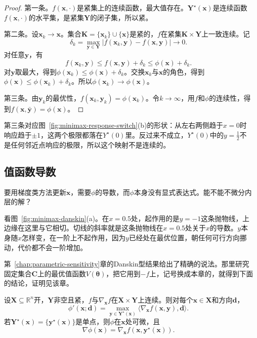 \begin{proof}
第一条。$f(\bm{x},\cdot)$是紧集上的连续函数，最大值存在。$\bm{Y}^\star(\bm{x})$是连续函数$f(\bm{x},\cdot)$的水平集，是紧集$\bm{Y}$的闭子集，所以紧。

第二条。设$\bm{x}_k\to\bm{x}$。集合$\bm{K}=\{\bm{x}_k\}\cup\{\bm{x}\}$是紧的，$f$在紧集$\bm{K}\times\bm{Y}$上一致连续。记
\[
 \delta_k=\max_{\bm{y}\in\bm{Y}}\lvert f(\bm{x}_k,\bm{y})-f(\bm{x},\bm{y})\rvert\to0.
\]
对任意$\bm{y}$，有
\[
 f(\bm{x}_k,\bm{y})\leq f(\bm{x},\bm{y})+\delta_k\leq\phi(\bm{x})+\delta_k.
\]
对$\bm{y}$取最大，得到$\phi(\bm{x}_k)\leq\phi(\bm{x})+\delta_k$。交换$\bm{x}_k$与$\bm{x}$的角色，得到$\phi(\bm{x})\leq\phi(\bm{x}_k)+\delta_k$。所以$\phi(\bm{x}_k)\to\phi(\bm{x})$。

第三条。由$\bm{y}_k$的最优性，$f(\bm{x}_k,\bm{y}_k)=\phi(\bm{x}_k)$。令$k\to\infty$，用$f$和$\phi$的连续性，得到$f(\bm{x},\bar{\bm{y}})=\phi(\bm{x})$。
\end{proof}

第三条对应图~\ref{fig:minimax-response-switch}(b)的形状：从左右两侧趋于$x=0$时响应趋于$\pm1$，这两个极限都落在$Y^\star(0)$里。反过来不成立，$Y^\star(0)$中的$y=\frac12$不是任何邻近点响应的极限，所以这个映射不是连续的。

\subsection{值函数导数}
\label{sec:minimax-danskin}

要用梯度类方法更新$\bm{x}$，需要$\phi$的导数，而$\phi$本身没有显式表达式。能不能不微分内层的解？

看图~\ref{fig:minimax-danskin}(a)。在$x=0.5$处，起作用的是$y=-1$这条抛物线，上边缘在这里与它相切。切线的斜率就是这条抛物线在$x=0.5$处关于$x$的导数。$y$本身随$x$怎样变，在一阶上不起作用，因为$y$已经处在最优位置，朝任何可行方向挪动，代价都不会一阶增加。

第~\ref{chap:parametric-sensitivity}章的Danskin型结果给出了精确的说法。那里研究固定集合$\bm{C}$上的最优值函数$V(\bm{\theta})$，把它用到$-f$上，记号换成本章的，就得到下面的结论，证明见该章。

\begin{theorem}[最坏值函数的方向导数]
\label{thm:minimax-danskin}
设$\bm{X}\subseteq\mathbb{R}^{n}$开，$\bm{Y}$非空且紧，$f$与$\nabla_{\bm{x}}f$在$\bm{X}\times\bm{Y}$上连续。则对每个$\bm{x}\in\bm{X}$和方向$\bm{d}$，
\begin{equation}
 \phi'(\bm{x};\bm{d})=\max_{\bm{y}\in\bm{Y}^\star(\bm{x})}\bigl\langle\nabla_{\bm{x}}f(\bm{x},\bm{y}),\bm{d}\bigr\rangle.
 \label{eq:minimax-danskin}
\end{equation}
若$\bm{Y}^\star(\bm{x})=\{\bm{y}^\star(\bm{x})\}$是单点，则$\phi$在$\bm{x}$处可微，且
\begin{equation}
 \nabla\phi(\bm{x})=\nabla_{\bm{x}}f(\bm{x},\bm{y}^\star(\bm{x})).
 \label{eq:minimax-danskin-gradient}
\end{equation}
\end{theorem}

